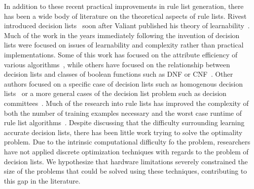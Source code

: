 In addition to these recent practical improvements in rule list generation, there has been a wide body of literature on the theoretical aspects of rule lists.
Rivest introduced decision lists~\cite{Rivest87} soon after Valiant published his theory of learnability~\cite{Valiant84}.
Much of the work in the years immediately following the invention of decision lists were focused on issues of learnability and complexity rather than practical implementations.
Some of this work has focused on the attribute efficiency of various algorithms~\cite{Blum92, DhagatHe94}, while others have focused on the relationship between decision lists and classes of boolean functions such as DNF or CNF~\cite{Rivest87, EiterIbMa02}.
Other authors focused on a specific case of decision lists such as homogenous decision lists~\cite{SegalOr94} or a more general cases of the decision list problem such as decision committees~\cite{NockGa95}.
Much of the research into rule lists has improved the complexity of both the number of training examples necessary and the worst case runtime of rule list algorithms~\cite{KlivansSe06}.
Despite discussing that the difficulty surrounding learning accurate decision lists, there has been little work trying to solve the optimality problem.
Due to the intrinsic computational difficulty fo the problem, researchers have not applied discrete optimization techniques with regards to the problem of decision lists.
We hypothesize that hardware limitations severely constrained the size of the problems that could be solved using these techniques, contributing to this gap in the literature.

